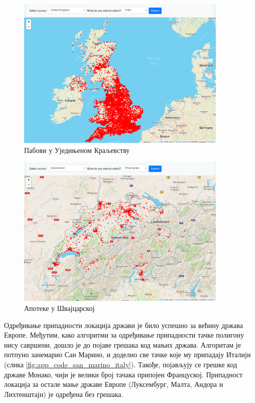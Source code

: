 \documentclass[12pt,oneside]{memoir}
\begin{document}
\begin{figure}[!ht]
  \centering
  \includegraphics[width=0.9\textwidth]{pictures/uk_pubs.png}
  \caption{Пабови у Уједињеном Краљевству}
  \label{fig:app_code_uk_pubs}
\end{figure}

\begin{figure}[!ht]
  \centering
  \includegraphics[width=0.9\textwidth]{pictures/switzerland_pharmacies.png}
  \caption{Апотеке у Швајцарској}
  \label{fig:app_code_switzerland_pharmacies}
\end{figure}

Одређивање припадности локација држави је било успешно за већину држава Европе. Међутим, како алгоритми за одређивање припадности тачке полигону нису савршени, дошло је до појаве грешака код мањих држава. Алгоритам је потпуно занемарио Сан Марино, и доделио све тачке које му припадају Италији (слика \ref{fig:app_code_san_marino_italy}). Такође, појављују се грешке код државе Монако, чији је велики број тачака припојен Француској. Припадност локација за остале мање државе Европе (Луксембург, Малта, Андора и Лихтенштајн) је одређена без грешака.
\end{document}
